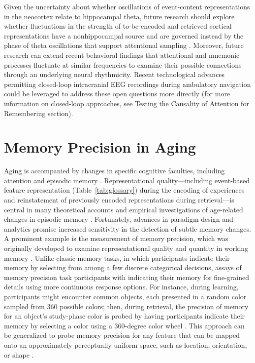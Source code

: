 Given the uncertainty about whether oscillations of event-content representations in the neocortex relate to hippocampal theta, future research should explore whether fluctuations in the strength of to-be-encoded and retrieved cortical representations have a nonhippocampal source and are governed instead by the phase of theta oscillations that support attentional sampling \parencite{busch2010spontaneous,fiebelkorn2019rhythmic}. Moreover, future research can extend recent behavioral findings that attentional and mnemonic processes fluctuate at similar frequencies to examine their possible connections through an underlying neural rhythmicity. Recent technological advances permitting closed-loop intracranial EEG recordings during ambulatory navigation \parencite{maoz2023dynamic} could be leveraged to address these open questions more directly (for more information on closed-loop approaches, see Testing the Causality of Attention for Remembering section).

\section{Memory Precision in Aging}
Aging is accompanied by changes in specific cognitive faculties, including attention and episodic memory \parencite[e.g.,][]{fortenbaugh2015sustained,hedden2004insights}. Representational quality—including event-based feature representation (Table~\ref{tab:glossary}) during the encoding of experiences and reinstatement of previously encoded representations during retrieval—is central in many theoretical accounts and empirical investigations of age-related changes in episodic memory \parencite[e.g.,][]{stark2019mnemonic,theves2024pattern,trelle2020hippocampal}. Fortunately, advances in paradigm design and analytics promise increased sensitivity in the detection of subtle memory changes. A prominent example is the measurement of memory precision, which was originally developed to examine representational quality and quantity in working memory \parencite[e.g.,][]{ma2014changing}. Unlike classic memory tasks, in which participants indicate their memory by selecting from among a few discrete categorical decisions, assays of memory precision task participants with indicating their memory for fine-grained details using more continuous response options. For instance, during learning, participants might encounter common objects, each presented in a random color sampled from 360 possible colors; then, during retrieval, the precision of memory for an object’s study-phase color is probed by having participants indicate their memory by selecting a color using a 360-degree color wheel \parencite[Fig.~\ref{fig:a2r-fig3}; e.g.,][]{sutterer2016retrieval}. This approach can be generalized to probe memory precision for any feature that can be mapped onto an approximately perceptually uniform space, such as location, orientation, or shape \parencite{cooper2019cortico,li2020validated,richter2016distinct}.

